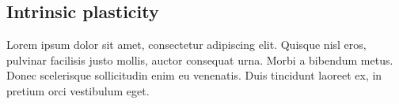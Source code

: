 \subsection{Intrinsic plasticity}
Lorem ipsum dolor sit amet, consectetur adipiscing elit. Quisque nisl eros, 
pulvinar facilisis justo mollis, auctor consequat urna. Morbi a bibendum metus. 
Donec scelerisque sollicitudin enim eu venenatis. Duis tincidunt laoreet ex, 
in pretium orci vestibulum eget.
